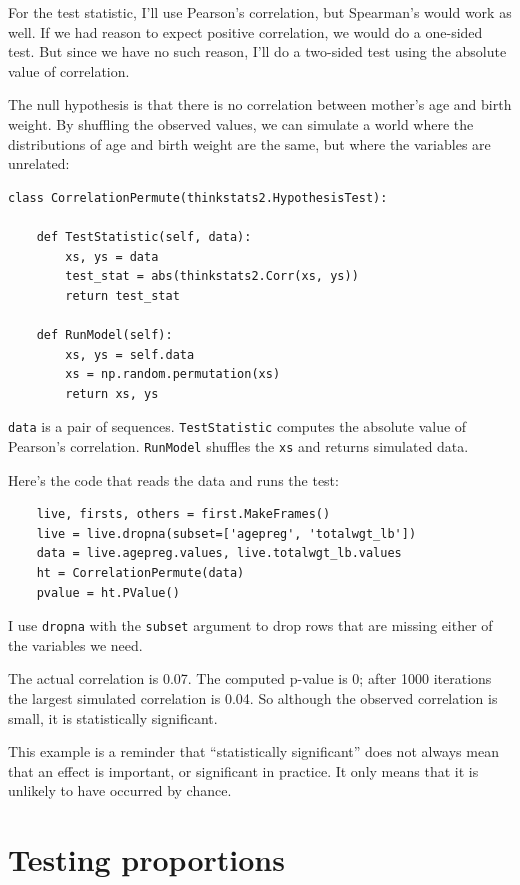 \documentclass[12pt]{book}
\begin{document}
For the test statistic, I'll use
Pearson's correlation, but Spearman's would work as well.
If we had reason to expect positive correlation, we would do a
one-sided test.  But since we have no such reason, I'll
do a two-sided test using the absolute value of correlation.

The null hypothesis is that there is no correlation between mother's
age and birth weight.  By shuffling the observed values, we can
simulate a world where the distributions of age and
birth weight are the same, but where the variables are unrelated:

\begin{verbatim}
class CorrelationPermute(thinkstats2.HypothesisTest):

    def TestStatistic(self, data):
        xs, ys = data
        test_stat = abs(thinkstats2.Corr(xs, ys))
        return test_stat

    def RunModel(self):
        xs, ys = self.data
        xs = np.random.permutation(xs)
        return xs, ys
\end{verbatim}

{\tt data} is a pair of sequences.  {\tt TestStatistic} computes the
absolute value of Pearson's correlation.  {\tt RunModel} shuffles the
{\tt xs} and returns simulated data.

Here's the code that reads the data and runs the test:

\begin{verbatim}
    live, firsts, others = first.MakeFrames()
    live = live.dropna(subset=['agepreg', 'totalwgt_lb'])
    data = live.agepreg.values, live.totalwgt_lb.values
    ht = CorrelationPermute(data)
    pvalue = ht.PValue()
\end{verbatim}

I use {\tt dropna} with the {\tt subset} argument to drop rows
that are missing either of the variables we need.

The actual correlation is 0.07.  The computed p-value is 0; after 1000
iterations the largest simulated correlation is 0.04.  So although the
observed correlation is small, it is statistically significant.

This example is a reminder that ``statistically significant'' does not
always mean that an effect is important, or significant in practice.
It only means that it is unlikely to have occurred by chance.


\section{Testing proportions}
\end{document}
